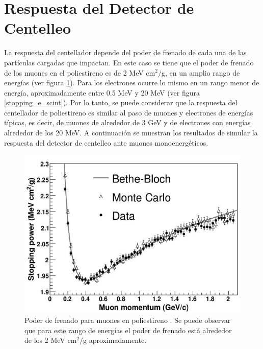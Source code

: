 \documentclass[12pt,oneside,openany,letter]{book}
\begin{document}

\section{Respuesta del Detector de 
Centelleo}
La respuesta del centellador depende del poder de frenado de cada una de las partículas cargadas que impactan. En este caso se tiene que el poder de frenado de los muones en el poliestireno es de 2 MeV cm$^2/$g, en un amplio rango de energías (ver figura \ref{stopping_mu_scint}). Para los electrones ocurre lo mismo en un rango menor de energía, aproximadamente entre 0.5 MeV y 20 MeV (ver figura \ref{stopping_e_scint}). Por lo tanto, se puede considerar que la respuesta del centellador de poliestireno es similar al paso de muones y electrones de energ\'ias t\'ipicas, es decir, de muones de alrededor de 3 GeV y de electrones con energ\'ias alrededor de los 20 MeV. A continuaci\'on se muestran los resultados de simular la respuesta del detector de centelleo ante muones monoenerg\'eticos.  
\begin{figure}[h!]
    \centering        \includegraphics[scale=0.6]{stopping_mu_scint.png}
\caption[Poder de frenado para muones en poliestireno]{Poder de frenado para muones en poliestireno \cite{Gonzalez-maestrando2012}. Se puede observar que para este rango de energ\'ias el poder de frenado est\'a alrededor de los 2 MeV cm$^2/$g aproximadamente.}\label{stopping_mu_scint}
\end{figure}
\end{document}
